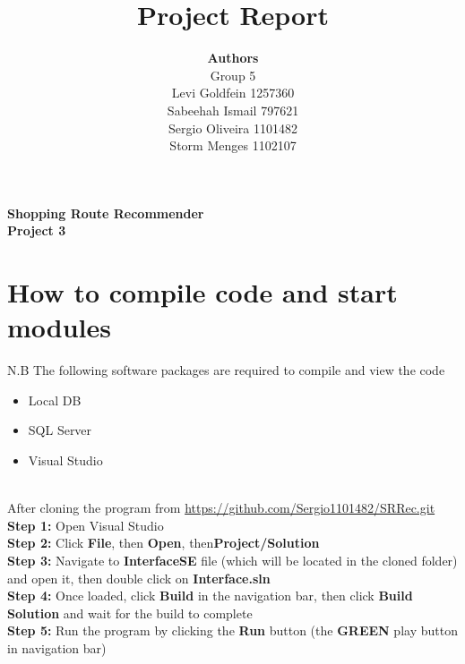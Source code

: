 \documentclass[12pt]{article}
\begin{document}
 
 
\title{Project Report }
\author{\textbf{Authors}\\Group 5\\Levi Goldfein 1257360\\Sabeehah Ismail 797621\\ Sergio Oliveira 1101482 \\Storm Menges 1102107}
\maketitle

\begin{center}
\LARGE
\textbf{Shopping Route Recommender\\Project 3}
\end{center}
\pagebreak



\tableofcontents
\pagebreak

\section{How to compile code and start modules}
{\color{red} N.B The following software packages are required to compile and view the code
\begin{itemize}
\item Local DB
\item SQL Server
\item Visual Studio
\end{itemize}}
\hfill\\
After cloning the program from \url{https://github.com/Sergio1101482/SRRec.git}\\
\hfill
\textbf{Step 1:} Open Visual Studio\\
\textbf{Step 2:} Click \textbf{File}, then \textbf{Open}, then\textbf{Project/Solution}\\
\textbf{Step 3:} Navigate to \textbf{InterfaceSE} file (which will       be located in the cloned folder) and open it, then double click on \textbf{Interface.sln}\\
\textbf{Step 4:} Once loaded, click \textbf{Build} in the navigation bar, then click \textbf{Build Solution} and wait for the build to complete\\
\textbf{Step 5:} Run the program by clicking the \textbf{Run} button (the {\color{green} \textbf{GREEN}} play button in navigation bar)
\end{document}
